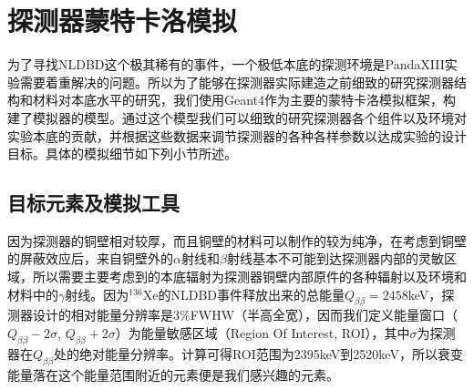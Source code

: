 \chapter{探测器蒙特卡洛模拟}
\label{chapter:background}

为了寻找NLDBD这个极其稀有的事件，一个极低本底的探测环境是PandaXIII实验需要着重解决的问题。所以为了能够在探测器实际建造之前细致的研究探测器结构和材料对本底水平的研究，我们使用Geant4\supercite{Agostinelli:2002hh}作为主要的蒙特卡洛模拟框架，构建了模拟器的模型。通过这个模型我们可以细致的研究探测器各个组件以及环境对实验本底的贡献，并根据这些数据来调节探测器的各种各样参数以达成实验的设计目标。具体的模拟细节如下列小节所述。

\section{目标元素及模拟工具}

因为探测器的铜壁相对较厚，而且铜壁的材料可以制作的较为纯净，在考虑到铜壁的屏蔽效应后，来自铜壁外的$\alpha$射线和$\beta$射线基本不可能到达探测器内部的灵敏区域，所以需要主要考虑到的本底辐射为探测器铜壁内部原件的各种辐射以及环境和材料中的$\gamma$射线。因为$^{136}$Xe的NLDBD事件释放出来的总能量$Q_{\beta\beta}=2458$keV，探测器设计的相对能量分辨率是3\%FWHW（半高全宽），因而我们定义能量窗口（$Q_{\beta\beta}-2\sigma$, $Q_{\beta\beta}+2\sigma$）为能量敏感区域（Region Of Interest, ROI），其中$\sigma$为探测器在$Q_{\beta\beta}$处的绝对能量分辨率。计算可得ROI范围为2395keV到2520keV，所以衰变能量落在这个能量范围附近的元素便是我们感兴趣的元素。

